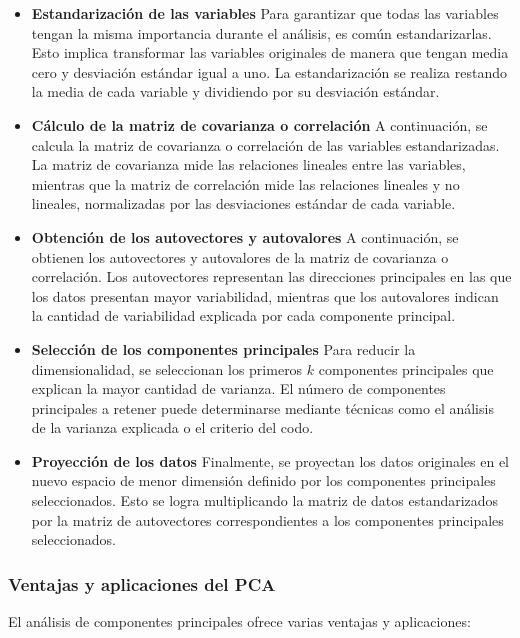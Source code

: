 \documentclass{article}
\begin{document}
\begin{itemize}
\item \textbf{Estandarización de las variables}
Para garantizar que todas las variables tengan la misma importancia durante el análisis, es común estandarizarlas. Esto implica transformar las variables originales de manera que tengan media cero y desviación estándar igual a uno. La estandarización se realiza restando la media de cada variable y dividiendo por su desviación estándar.

\item \textbf{Cálculo de la matriz de covarianza o correlación}
A continuación, se calcula la matriz de covarianza o correlación de las variables estandarizadas. La matriz de covarianza mide las relaciones lineales entre las variables, mientras que la matriz de correlación mide las relaciones lineales y no lineales, normalizadas por las desviaciones estándar de cada variable.

\item \textbf{Obtención de los autovectores y autovalores}
A continuación, se obtienen los autovectores y autovalores de la matriz de covarianza o correlación. Los autovectores representan las direcciones principales en las que los datos presentan mayor variabilidad, mientras que los autovalores indican la cantidad de variabilidad explicada por cada componente principal.

\item \textbf{Selección de los componentes principales}
Para reducir la dimensionalidad, se seleccionan los primeros $k$ componentes principales que explican la mayor cantidad de varianza. El número de componentes principales a retener puede determinarse mediante técnicas como el análisis de la varianza explicada o el criterio del codo.

\item \textbf{Proyección de los datos}
Finalmente, se proyectan los datos originales en el nuevo espacio de menor dimensión definido por los componentes principales seleccionados. Esto se logra multiplicando la matriz de datos estandarizados por la matriz de autovectores correspondientes a los componentes principales seleccionados.

\end{itemize}


\subsubsection{Ventajas y aplicaciones del PCA}
El análisis de componentes principales ofrece varias ventajas y aplicaciones:
\end{document}
